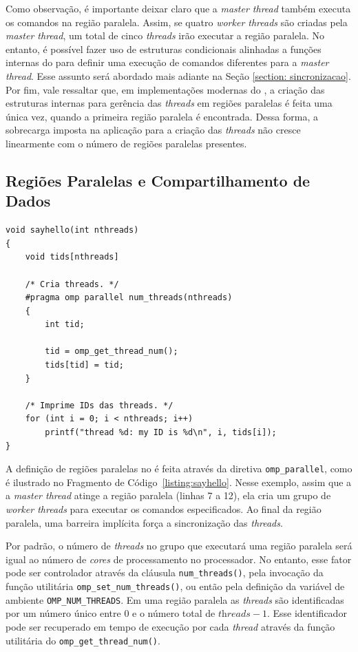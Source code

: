 \documentclass{SBCbookchapter}
\begin{document}
		Como observação, é importante deixar claro que a \textit{master
		thread} também executa os comandos na região paralela. Assim, se
		quatro \textit{worker threads} são criadas pela \textit{master
		thread}, um total de cinco \textit{threads} irão executar a
		região paralela.  No entanto, é possível fazer uso de estruturas
		condicionais alinhadas a funções internas do \openmp para
		definir uma execução de comandos diferentes para a
		\textit{master thread}. Esse assunto será abordado mais adiante
		na Seção \ref{section: sincronizacao}. Por fim, vale ressaltar
		que, em implementações modernas do \openmp, a criação das
		estruturas internas para gerência das \textit{threads} em
		regiões paralelas é feita uma única vez, quando a primeira
		região paralela é encontrada. Dessa forma, a sobrecarga imposta
		na aplicação para a criação das \textit{threads} não cresce
		linearmente com o número de regiões paralelas presentes.

	\subsection{Regiões Paralelas e Compartilhamento de Dados}
	\label{subsection: regioes paralelas e compartilhamento de dados}

\begin{lstlisting}[frame=single,float,floatplacement=t,caption=Um exemplo simples com uma região paralela.,label=listing:sayhello] 
void sayhello(int nthreads)
{
	void tids[nthreads]

	/* Cria threads. */
	#pragma omp parallel num_threads(nthreads)
	{
		int tid;

		tid = omp_get_thread_num();
		tids[tid] = tid;
	}

	/* Imprime IDs das threads. */
	for (int i = 0; i < nthreads; i++)
		printf("thread %d: my ID is %d\n", i, tids[i]);
}
\end{lstlisting}

		A definição de regiões paralelas no \openmp é feita através da
		diretiva \texttt{omp\_parallel}, como é ilustrado no Fragmento
		de Código~\ref{listing:sayhello}.  Nesse exemplo, assim que a a
		\textit{master thread} atinge a região paralela (linhas 7 a 12),
		ela cria um grupo de \textit{worker threads} para executar os
		comandos especificados. Ao final da região paralela, uma
		barreira implícita força a sincronização das \textit{threads}.
		
		Por padrão, o número de \textit{threads} no grupo que executará
		uma região paralela será igual ao número de \textit{cores} de
		processamento no processador. No entanto, esse fator pode ser
		controlador através da cláusula \texttt{num\_threads()}, pela
		invocação da função utilitária
		\texttt{omp\_set\_num\_threads()}, ou então pela definição da
		variável de ambiente \texttt{OMP\_NUM\_THREADS}. Em uma região
		paralela as \textit{threads} são identificadas por um número
		único entre $0$ e o número total de $\textit{threads} - 1$.
		Esse identificador pode ser recuperado em tempo de execução por
		cada \textit{thread} através da função utilitária do \openmp
		\texttt{omp\_get\_thread\_num()}.
\end{document}
